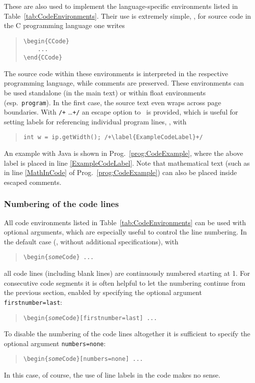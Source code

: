 These are also used to implement the language-specific environments listed in
Table~\ref{tab:CodeEnvironments}. Their use is extremely simple, \eg, for
source code in the C programming language one writes
%
\begin{quote}
    \begin{verbatim}
\begin{CCode}
    ... 
\end{CCode}
    \end{verbatim}
\end{quote}
%
The source code within these environments is interpreted in the respective
programming language, while comments are preserved. These environments can be
used standalone (in the main text) or within float environments (esp.\
\texttt{program}). In the first case, the source text even wraps across page
boundaries. With \verb!/+! \ldots \verb!+/! an escape option to \latex\ is
provided, which is useful for setting labels for referencing individual
program lines, \eg, with
%
\begin{quote}
    \verb!int w = ip.getWidth(); /+\label{ExampleCodeLabel}+/!
\end{quote}
%
An example with Java is shown in Prog.~\ref{prog:CodeExample}, where the
above label is placed in line \ref{ExampleCodeLabel}. Note that mathematical
text (such as in line \ref{MathInCode} of Prog.~\ref{prog:CodeExample}) can
also be placed inside escaped comments.

\subsubsection{Numbering of the code lines}

All code environments listed in Table~\ref{tab:CodeEnvironments} can be used
with optional arguments, which are especially useful to control the line
numbering. In the default case (\ie, without additional specifications), with
%
\begin{quote}
    \verb!\begin{!\texttt{\emph{some}Code}\verb!} ... !
\end{quote}
%
all code lines (including blank lines) are continuously numbered starting at
1. For consecutive code segments it is often helpful to let the numbering
continue from the previous section, enabled by specifying the optional argument
\texttt{firstnumber={\obnh}last}:
%
\begin{quote}
    \verb!\begin{!\texttt{\emph{some}Code}\verb!}[firstnumber=last] ... !
\end{quote}
%
To disable the numbering of the code lines altogether it is sufficient to
specify the optional argument
\texttt{numbers={\obnh}none}:
%
\begin{quote}
    \verb!\begin{!\texttt{\emph{some}Code}\verb!}[numbers=none] ... !
\end{quote}
%
In this case, of course, the use of line labels in the code makes no sense.

